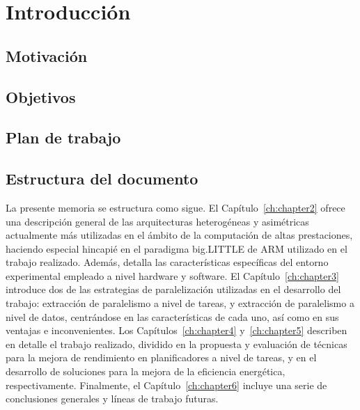 \cleardoublepage


\chapter{Introducción}
\label{ch:chapter1}

\section{Motivación}

\section{Objetivos}

\section{Plan de trabajo}

\section{Estructura del documento}

La presente memoria se estructura como sigue. 
El Capítulo~\ref{ch:chapter2} ofrece una descripción general de las arquitecturas heterogéneas
y asimétricas actualmente más utilizadas en el ámbito de la computación de altas prestaciones,
haciendo especial hincapié en el paradigma big.LITTLE de ARM utilizado en el trabajo realizado. Además,
detalla las características específicas del entorno experimental empleado a nivel hardware y software.
El Capítulo~\ref{ch:chapter3} introduce dos de las estrategias de paralelización utilizadas en el
desarrollo del trabajo: extracción de paralelismo a nivel de tareas, y extracción de paralelismo
a nivel de datos, centrándose en las características de cada uno, así como en sus ventajas e inconvenientes.
Los Capítulos~\ref{ch:chapter4} y~\ref{ch:chapter5} describen en detalle el trabajo realizado, dividido
en la propuesta y evaluación de técnicas para la mejora de rendimiento en planificadores a nivel de tareas,
y en el desarrollo de soluciones para la mejora de la eficiencia energética, respectivamente.
Finalmente, el Capítulo~\ref{ch:chapter6} incluye una serie de conclusiones generales y líneas
de trabajo futuras.




